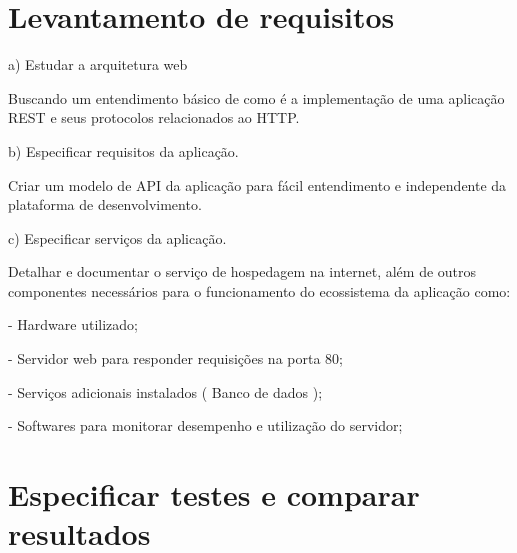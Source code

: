 \section{Levantamento de requisitos}

   \begin{compactitem}
      \item[a)] Estudar a arquitetura web
      
      Buscando um entendimento básico de como é a implementação de uma aplicação 
      \ac{REST} e seus protocolos relacionados ao HTTP.
      
      \item[b)] Especificar requisitos da aplicação.
      
      Criar um modelo de \ac{API} da aplicação para fácil entendimento e
      independente da plataforma de desenvolvimento.
      
      \item[c)] Especificar serviços da aplicação.
      
      Detalhar e documentar o serviço de hospedagem na internet, além de outros componentes 
      necessários para o funcionamento do ecossistema da aplicação como:
      
	\begin{compactitem}
	  \item[-] Hardware utilizado;
	  \item[-] Servidor web para responder requisições na porta 80;
	  \item[-] Serviços adicionais instalados ( Banco de dados );
	  \item[-] Softwares para monitorar desempenho e utilização do servidor;
	\end{compactitem}
	
    \end{compactitem}


\section{Especificar testes e comparar resultados}

